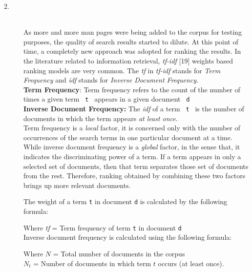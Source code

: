 \documentclass[letterpaper,twocolumn,10pt]{article}
\begin{document}
\begin{description}
\item[2.] \hfill \\
As more and more man pages were being added to the corpus for testing purposes,
the quality of search results started to dilute. At this point of time, a
completely new approach was adopted for ranking the results. In the literature
related to information retrieval, \textit{tf-idf} [19] weights based ranking models are very common. The \textit{tf} in \textit{tf-idf} stands for \emph{Term Frequency} and \textit{idf} stands for \emph{Inverse Document Frequency}. \\

{\bf Term Frequency}: Term frequency refers to the count of the number of times
a given term
{\tt \small
t
}
appears in a given document
{\tt \small
d
} \\

{\bf Inverse Document Frequency:} The \textit{idf} of a term
{\tt \small
t
}
is the number of documents in which the term appears \textit{at least once}. \\

Term frequency is a \textit{local} factor, it is concerned only with the number
of occurrences of the search terms in one particular document at a time.
While inverse document frequency is a \textit{global} factor, in the sense that,
it indicates the discriminating power of a term. If a term appears in only a
selected set of documents, then that term separates those set of
documents from the rest. Therefore, ranking obtained by combining these two factors
brings up more relevant documents.

The weight of a term
{\tt \small t} in document {\tt \small d} is calculated by the following
formula:

\begin{center}
\end{center}
Where \textit{tf} = Term frequency of term {\tt \small t} in document
{\tt \small d} \\

Inverse document frequency is calculated using the following formula:
\begin{center}
\end{center}
Where $N$ = Total number of documents in the corpus \\
$N_t$ = Number of documents in which term $t$ occurs (at least once). \\


\end{description}
\end{document}
